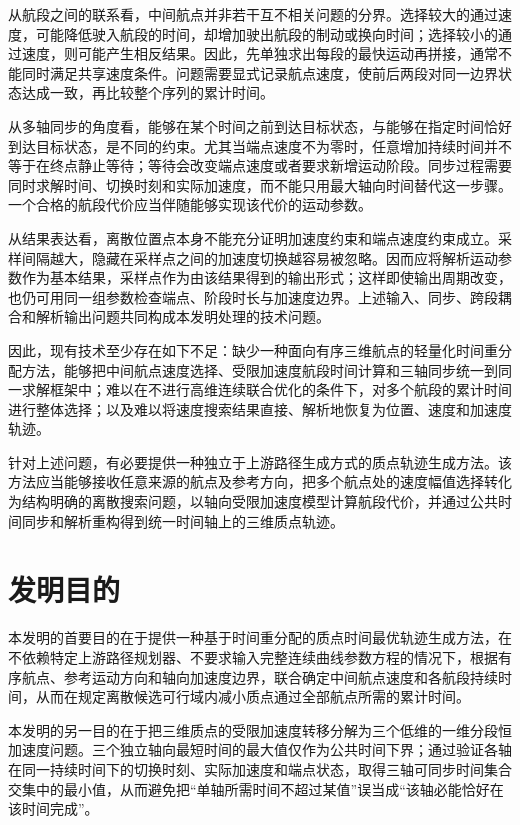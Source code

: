 \documentclass[UTF8,a4paper,12pt,fontset=fandol]{ctexart}
\begin{document}
从航段之间的联系看，中间航点并非若干互不相关问题的分界。选择较大的通过速度，可能降低驶入航段的时间，却增加驶出航段的制动或换向时间；选择较小的通过速度，则可能产生相反结果。因此，先单独求出每段的最快运动再拼接，通常不能同时满足共享速度条件。问题需要显式记录航点速度，使前后两段对同一边界状态达成一致，再比较整个序列的累计时间。

从多轴同步的角度看，能够在某个时间之前到达目标状态，与能够在指定时间恰好到达目标状态，是不同的约束。尤其当端点速度不为零时，任意增加持续时间并不等于在终点静止等待；等待会改变端点速度或者要求新增运动阶段。同步过程需要同时求解时间、切换时刻和实际加速度，而不能只用最大轴向时间替代这一步骤。一个合格的航段代价应当伴随能够实现该代价的运动参数。

从结果表达看，离散位置点本身不能充分证明加速度约束和端点速度约束成立。采样间隔越大，隐藏在采样点之间的加速度切换越容易被忽略。因而应将解析运动参数作为基本结果，采样点作为由该结果得到的输出形式；这样即使输出周期改变，也仍可用同一组参数检查端点、阶段时长与加速度边界。上述输入、同步、跨段耦合和解析输出问题共同构成本发明处理的技术问题。

因此，现有技术至少存在如下不足：缺少一种面向有序三维航点的轻量化时间重分配方法，能够把中间航点速度选择、受限加速度航段时间计算和三轴同步统一到同一求解框架中；难以在不进行高维连续联合优化的条件下，对多个航段的累计时间进行整体选择；以及难以将速度搜索结果直接、解析地恢复为位置、速度和加速度轨迹。

针对上述问题，有必要提供一种独立于上游路径生成方式的质点轨迹生成方法。该方法应当能够接收任意来源的航点及参考方向，把多个航点处的速度幅值选择转化为结构明确的离散搜索问题，以轴向受限加速度模型计算航段代价，并通过公共时间同步和解析重构得到统一时间轴上的三维质点轨迹。

\section{发明目的}

本发明的首要目的在于提供一种基于时间重分配的质点时间最优轨迹生成方法，在不依赖特定上游路径规划器、不要求输入完整连续曲线参数方程的情况下，根据有序航点、参考运动方向和轴向加速度边界，联合确定中间航点速度和各航段持续时间，从而在规定离散候选可行域内减小质点通过全部航点所需的累计时间。

本发明的另一目的在于把三维质点的受限加速度转移分解为三个低维的一维分段恒加速度问题。三个独立轴向最短时间的最大值仅作为公共时间下界；通过验证各轴在同一持续时间下的切换时刻、实际加速度和端点状态，取得三轴可同步时间集合交集中的最小值，从而避免把“单轴所需时间不超过某值”误当成“该轴必能恰好在该时间完成”。
\end{document}
